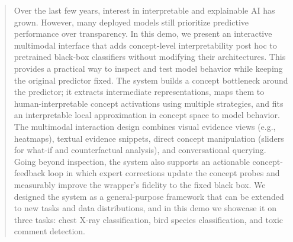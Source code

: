 \documentclass[sigconf,review,screen]{acmart}
\begin{document}
\begin{abstract}
    Over the last few years, interest in interpretable and explainable AI has grown. However, many deployed models still prioritize predictive performance over transparency. In this demo, we present an interactive multimodal interface that adds concept-level interpretability post hoc to pretrained black-box classifiers without modifying their architectures. This provides a practical way to inspect and test model behavior while keeping the original predictor fixed. The system builds a concept bottleneck around the predictor; it extracts intermediate representations, maps them to human-interpretable concept activations using multiple strategies, and fits an interpretable local approximation in concept space to model behavior. The multimodal interaction design combines visual evidence views (e.g., heatmaps), textual evidence snippets, direct concept manipulation (sliders for what-if and counterfactual analysis), and conversational querying. Going beyond inspection, the system also supports an actionable concept-feedback loop in which expert corrections update the concept probes and measurably improve the wrapper's fidelity to the fixed black box. We designed the system as a general-purpose framework that can be extended to new tasks and data distributions, and in this demo we showcase it on three tasks: chest X-ray classification, bird species classification, and toxic comment detection.  
\end{abstract}
\end{document}
